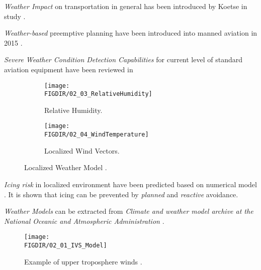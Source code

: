     \emph{Weather Impact} on transportation in general has been introduced by Koetse in study \cite{koetse2009impact}.
    
    \emph{Weather-based} preemptive planning have been introduced into manned aviation in 2015 \cite{yamashita2015climate}. 
    
    \emph{Severe Weather Condition Detection Capabilities} for current level of standard aviation equipment have been reviewed in \cite{smith2016multi} 
    
    \begin{figure}[H]
	\centering
	\begin{subfigure}{0.45\textwidth}
		\texttt{[image: \\FIGDIR/02\_03\_RelativeHumidity]}
		\caption{Relative Humidity.} 
	\end{subfigure}
	\vspace{1em} 
	\begin{subfigure}{0.45\textwidth} %
		\texttt{[image: \\FIGDIR/02\_04\_WindTemperature]}
		\caption{Localized Wind Vectors.} %
	\end{subfigure}
	\caption{Localized Weather Model \cite{balaban2017dynamic}.} %
    \end{figure}
    
    \emph{Icing risk} in localized environment have been predicted based on numerical model \cite{thompson2017numerical}. It is shown that icing can be prevented by \emph{planned} and \emph{reactive} avoidance.
    
    \emph{Weather Models} can be extracted from \emph{Climate and weather model archive at the National Oceanic and Atmospheric Administration} \cite{rutledge2006nomads}.
    
    \begin{figure}[H]
        \centering
        \texttt{[image: \\FIGDIR/02\_01\_IVS\_Model]}
        \caption{Example of upper troposphere winds \cite{rutledge2006nomads}.}
        \label{fig:ExampleOfTroposphereWinds}
    \end{figure}

